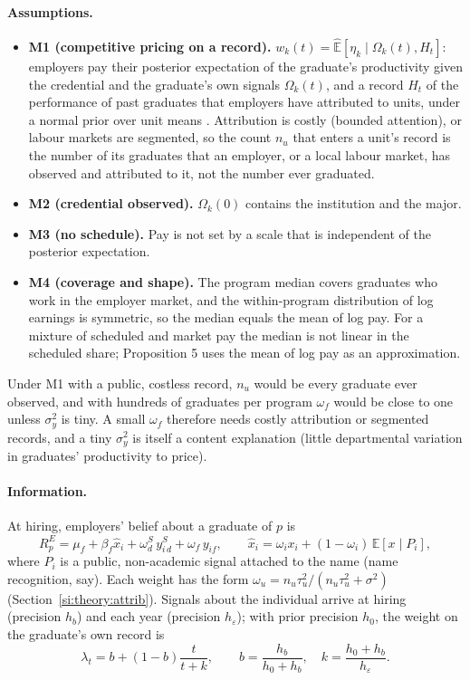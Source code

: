 \documentclass[11pt]{article}
\begin{document}
\paragraph{Assumptions.}
\begin{itemize}
\item \textbf{M1 (competitive pricing on a record).} $w_k(t)=\hat{\mathbb E}[\eta_k\mid\Omega_k(t),H_t]$:
employers pay their posterior expectation of the graduate's productivity given the credential and the graduate's
own signals $\Omega_k(t)$, and a record $H_t$ of the performance of past graduates that employers have attributed
to units, under a normal prior over unit means \citep{farber1996learning}. Attribution is costly (bounded
attention), or labour markets are segmented, so the count $n_u$ that enters a unit's record is the number of its
graduates that an employer, or a local labour market, has observed and attributed to it, not the number ever
graduated.
\item \textbf{M2 (credential observed).} $\Omega_k(0)$ contains the institution and the major.
\item \textbf{M3 (no schedule).} Pay is not set by a scale that is independent of the posterior expectation.
\item \textbf{M4 (coverage and shape).} The program median covers graduates who work in the employer market, and
the within-program distribution of log earnings is symmetric, so the median equals the mean of log pay. For a
mixture of scheduled and market pay the median is not linear in the scheduled share; Proposition 5 uses the
mean of log pay as an approximation.
\end{itemize}
Under M1 with a public, costless record, $n_u$ would be every graduate ever observed, and with hundreds of
graduates per program $\omega_f$ would be close to one unless $\sigma_y^2$ is tiny. A small $\omega_f$ therefore
needs costly attribution or segmented records, and a tiny $\sigma_y^2$ is itself a content explanation (little
departmental variation in graduates' productivity to price).

\paragraph{Information.} At hiring, employers' belief about a graduate of $p$ is
\[
R^E_p=\mu_f+\beta_f\hat x_i+\omega^S_d\,y^S_{i\,d}+\omega_f\,y_{if},\qquad \hat x_i=\omega_ix_i+(1-\omega_i)\,\mathbb E[x\mid P_i],
\]
where $P_i$ is a public, non-academic signal attached to the name (name recognition, say). Each weight has the form
$\omega_u=n_u\tau_u^2/(n_u\tau_u^2+\sigma^2)$ (Section~\ref{si:theory:attrib}). Signals about the individual
arrive at hiring (precision $h_b$) and each year (precision $h_\varepsilon$); with prior precision $h_0$, the
weight on the graduate's own record is
\[
\lambda_t=b+(1-b)\frac{t}{t+k},\qquad b=\frac{h_b}{h_0+h_b},\quad k=\frac{h_0+h_b}{h_\varepsilon} .
\]
\end{document}
